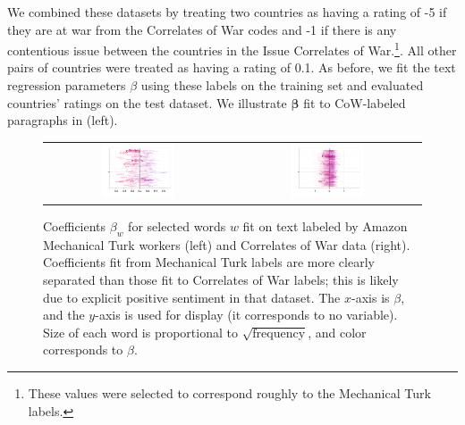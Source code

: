 We combined these datasets by treating two countries as having a
rating of -5 if they are at war from the Correlates of War codes and
-1 if there is any contentious issue between the countries in the
Issue Correlates of War.\footnote{These values were selected to
  correspond roughly to the Mechanical Turk labels.}.  All other pairs
of countries were treated as having a rating of 0.1.  As before, we
fit the text regression parameters $\beta$ using these labels on the
training set and evaluated countries' ratings on the test dataset. We
illustrate $\bm \beta$ fit to CoW-labeled paragraphs in
 (left).

\begin{figure}
  \begin{tabular}{cc}
    \includegraphics[width=0.4\textwidth]{chapter_foreign_relations/figures/mturk_sample_words.pdf} &
    \includegraphics[width=0.4\textwidth]{chapter_foreign_relations/figures/cow_sample_words.pdf} \\
    \end{tabular}
  \caption{Coefficients $\beta_w$ for selected words $w$ fit on text
    labeled by Amazon Mechanical Turk workers (left) and Correlates of
    War data (right). Coefficients fit from Mechanical Turk labels are
    more clearly separated than those fit to Correlates of War labels;
    this is likely due to explicit positive sentiment in that dataset.
    The $x$-axis is $\beta$, and the $y$-axis is used for display (it
    corresponds to no variable).  Size of each word is proportional to
    $\sqrt{\mbox{frequency}}$, and color corresponds to $\beta$.}
  \label{figure:fr_example_betas}
\end{figure}

